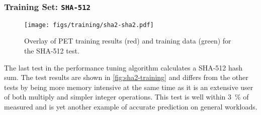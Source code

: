 \newpage

\subsubsection{Training Set: \texttt{SHA-512}}
\begin{figure}[htb]
    \centering
    \texttt{[image: figs/training/sha2-sha2.pdf]}
    \caption{Overlay of PET training results (red) and training data (green) for
    the SHA-512 test.}
    \label{fig:sha2-training}
\end{figure}

The last test in the performance tuning algorithm calculates a SHA-512 hash sum.
The test results are shown in \autoref{fig:sha2-training} and differs from the
other tests by being more memory intensive at the same time as it is an
extensive user of both multiply and simpler integer operations. This test is
well within 3~\% of measured and is yet another example of accurate prediction
on general workloads.

